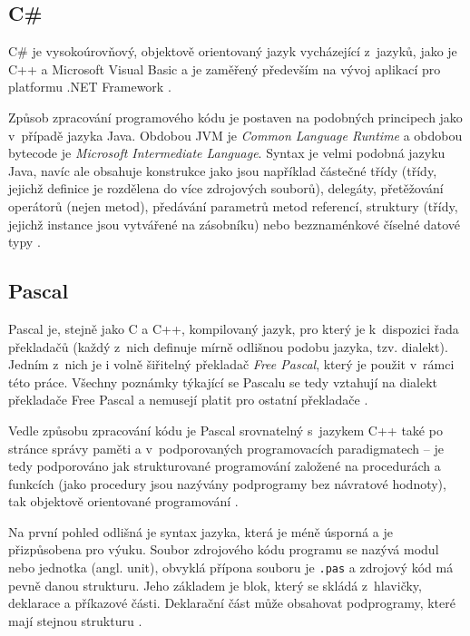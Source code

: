 \documentclass[czech,BP]{thesiskiv}
\begin{document}
\subsection{C\#}
C\# je vysokoúrovňový, objektově orientovaný jazyk vycházející z~jazyků, jako je C++ a Microsoft Visual Basic a je zaměřený především na vývoj aplikací pro platformu .NET Framework \cite{cs-book, cs-guide-basic}.\par
Způsob zpracování programového kódu je postaven na podobných principech jako v~případě jazyka Java. Obdobou JVM je \textit{Common Language Runtime} a obdobou bytecode je \textit{Microsoft Intermediate Language}. Syntax je velmi podobná jazyku Java, navíc ale obsahuje konstrukce jako jsou například částečné třídy (třídy, jejichž definice je rozdělena do více zdrojových souborů), delegáty, přetěžování operátorů (nejen metod), předávání parametrů metod referencí, struktury (třídy, jejichž instance jsou vytvářené na zásobníku) nebo bezznaménkové číselné datové typy \cite{cs-book, cs-guide-clr, cs-guide-msil, cs-guide-jit, cs-guide-types}.\par

\subsection{Pascal}
Pascal je, stejně jako C a C++, kompilovaný jazyk, pro který je k~dispozici řada překladačů (každý z~nich definuje mírně odlišnou podobu jazyka, tzv. dialekt). Jedním z~nich je i volně šiřitelný překladač \textit{Free Pascal}, který je použit v~rámci této práce. Všechny poznámky týkající se Pascalu se tedy vztahují na dialekt překladače Free Pascal a nemusejí platit pro ostatní překladače \cite{pas-book}.\par
Vedle způsobu zpracování kódu je Pascal srovnatelný s~jazykem C++ také po stránce správy paměti a v~podporovaných programovacích paradigmatech -- je tedy podporováno jak strukturované programování založené na procedurách a funkcích (jako procedury jsou nazývány podprogramy bez návratové hodnoty), tak objektově orientované programování \cite{pas-book}.\par
Na první pohled odlišná je syntax jazyka, která je méně úsporná a je přizpůsobena pro výuku. Soubor zdrojového kódu programu se nazývá modul nebo jednotka (angl. unit), obvyklá přípona souboru je \texttt{.pas} a zdrojový kód má pevně danou strukturu. Jeho základem je blok, který se skládá z~hlavičky, deklarace a příkazové části. Deklarační část může obsahovat podprogramy, které mají stejnou strukturu \cite{pas-book, pas-guide-about}.\par
\end{document}
